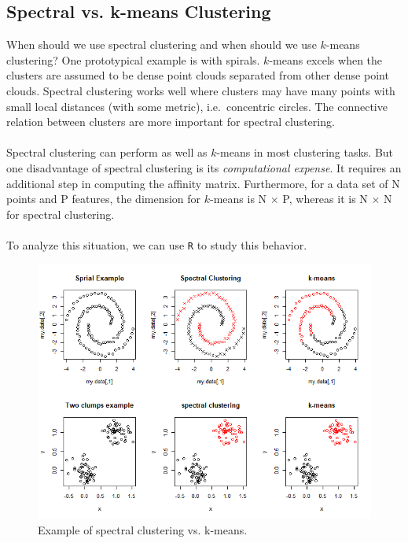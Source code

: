 \documentclass[12pt]{article}
\theoremstyle{plain}
\begin{document}
\subsection{Spectral vs. k-means Clustering}

When should we use spectral clustering and when should we use $ k $-means clustering?
One prototypical example is with spirals.
$ k $-means excels when the clusters are assumed to be dense point clouds separated from other dense point clouds.
Spectral clustering works well where clusters may have many points with small local distances (with some metric), i.e.\ concentric circles. The connective relation between clusters are more important for spectral clustering.
\\ \\
Spectral clustering can perform as well as $ k $-means in most clustering tasks. But one disadvantage of spectral clustering is its \textit{computational expense}. It requires an additional step in computing the affinity matrix. Furthermore, for a data set of N points and P features, the dimension for $ k $-means is N $\times$ P, whereas it is N $\times$ N for spectral clustering.
\\ \\
To analyze this situation, we can use \texttt{R} to study this behavior.
\begin{figure}[H]
  \captionsetup{width=0.8\textwidth}
  \centering
  \includegraphics[width=\textwidth]{sckmeans}
  \caption{
      Example of spectral clustering vs.  k-means.
  }
  \label{fig:sckmeans}
\end{figure}

\end{document}
